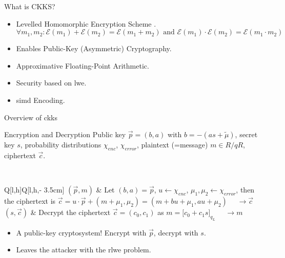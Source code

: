 \begin{frame}{What is CKKS?}
  \begin{itemize}
    \item Levelled Homomorphic Encryption Scheme \cite{2017-ckks-original}.
          $$\forall m_1, m_2: \mathcal{E}(m_1) + \mathcal{E}(m_2) = \mathcal{E}(m_1 + m_2) \text{ and } \mathcal{E}(m_1) \cdot \mathcal{E}(m_2) = \mathcal{E}(m_1 \cdot m_2)$$
    \item Enables Public-Key (Asymmetric) Cryptography.
    \item Approximative Floating-Point Arithmetic.
    \item Security based on \glsdesc{lwe}.
    \item \gls{simd} Encoding.
  \end{itemize}
\end{frame}

\begin{frame}{Overview of \gls{ckks}}
  \begin{figure}[H]
    \centering
    \label{fig:ckks-overview}
  \end{figure}
\end{frame}

\begin{frame}{Encryption and Decryption}
  Public key $\vec{p} = (b, a)$ with $b = -(as + \tilde{\mu})$, secret key $s$, probability distributions $\chi_{enc}$, $\chi_{error}$, plaintext (=message) $m \in R/qR$, ciphertext $\vec{c}$.

   \\
  \begin{tblr}{Q[l,h]Q[l,h,\textwidth - 3.5cm]}
    $(\vec{p}, m)$ & {
        Let $(b,a) = \vec{p}$, $u \leftarrow \chi_{enc}$, $\mu_1, \mu_2 \leftarrow \chi_{error}$,
        then the ciphertext is $\vec{c} = u \cdot \vec{p} + (m + \mu_1, \mu_2) = (m + bu + \mu_1, au + \mu_2)$
        $\quad\rightarrow \vec{c}$} \\
    $(s, \vec{c})$ & {
        Decrypt the ciphertext $\vec{c} = (c_0, c_1)$ as $m = \lbrack c_0 + c_1 s\rbrack_{q_L}$
        $\quad\rightarrow m$} \\
  \end{tblr}
  \begin{itemize}
    \item A public-key cryptosystem! Encrypt with $\vec{p}$, decrypt with $s$.
    \item Leaves the attacker with the \gls{rlwe} problem.
  \end{itemize}
\end{frame}

